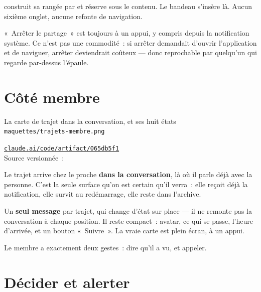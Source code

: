 \begin{constat}
 construit sa rangée par
 et réserve  sous le contenu. Le
bandeau s'insère là. Aucun sixième onglet, aucune refonte de navigation.
\end{constat}

«~Arrêter le partage~» est toujours à un appui, y compris depuis la notification système.
Ce n'est pas une commodité~: si arrêter demandait d'ouvrir l'application et de naviguer,
arrêter deviendrait coûteux --- donc reprochable par quelqu'un qui regarde par-dessus
l'épaule.

\section{Côté membre}

\begin{center}
    {La carte de trajet dans la conversation, et ses huit états\\
     \texttt{maquettes/trajets-membre.png}}
\end{center}

\begin{note}
\href{https://claude.ai/code/artifact/065db5f1-a69a-4ce1-af06-efa4ef13b29a}%
{\texttt{claude.ai/code/artifact/065db5f1}}\\
Source versionnée~: 
\end{note}

Le trajet arrive chez le proche \textbf{dans la conversation}, là où il parle déjà avec la
personne. C'est la seule surface qu'on est certain qu'il verra~: elle reçoit déjà la
notification, elle survit au redémarrage, elle reste dans l'archive.

Un \textbf{seul message} par trajet, qui change d'état sur place --- il ne remonte pas la
conversation à chaque position. Il reste compact~: avatar, ce qui se passe, l'heure
d'arrivée, et un bouton «~Suivre~». La vraie carte est plein écran, à un appui.

Le membre a exactement deux gestes~: dire qu'il a vu, et appeler.

\section{Décider et alerter}

